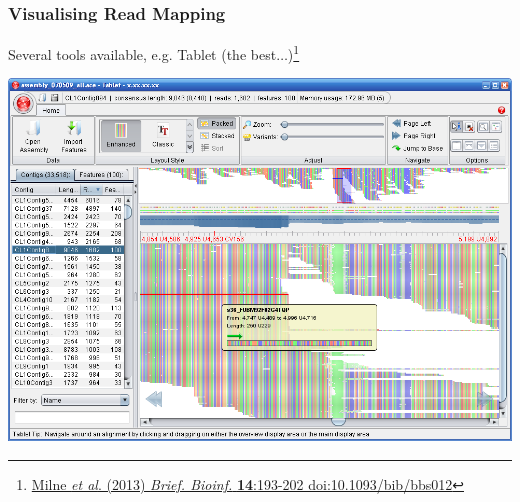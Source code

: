 \begin{frame}
  \frametitle{Visualising Read Mapping}
  Several tools available, e.g. Tablet (the best$\ldots$)\footnote{\tiny{\href{http://dx.doi.org/10.1093/bib/bbs012}{Milne \textit{et al}. (2013) \textit{Brief. Bioinf.} \textbf{14}:193-202 doi:10.1093/bib/bbs012}}}
  \begin{center}
    \includegraphics[height=0.65\textheight]{images/tablet1}
  \end{center}  
\end{frame}
